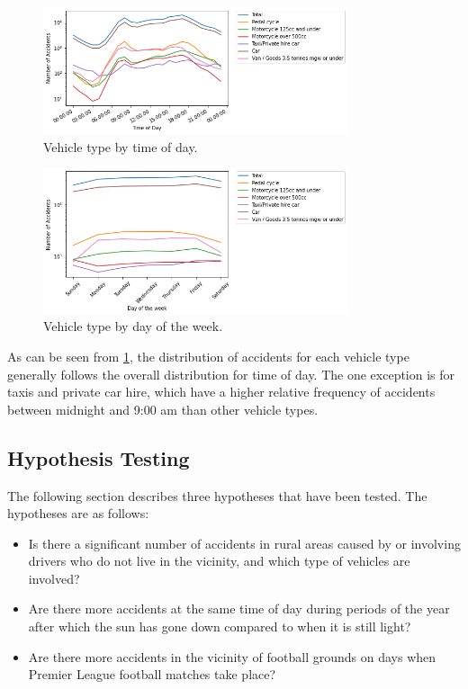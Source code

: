 \documentclass[12pt]{article}
\begin{document}
\begin{figure}[ht]
\centering     %
\includegraphics[width=0.80\textwidth]{vehicle_hour_plot}
\caption{Vehicle type by time of day.}
\label{fig:a-vehicle-hour}
\end{figure}

\begin{figure}[ht]
\centering     %
\includegraphics[width=0.80\textwidth]{vehicle_day_plot}
\caption{Vehicle type by day of the week.}
\label{fig:b-vehicle-day}
\end{figure}


\newpage

As can be seen from \ref{fig:a-vehicle-hour}, the distribution of accidents for each vehicle type generally follows the overall distribution for time of day. The one exception is for taxis and private car hire, which have a higher relative frequency of accidents between midnight and 9:00 am than other vehicle types.

\subsection{Hypothesis Testing}

The following section describes three hypotheses that have been tested. The hypotheses are as follows:

\begin{itemize}
\item Is there a significant number of accidents in rural areas caused by or involving drivers who do not live in the vicinity, and which type of vehicles are involved?
\item Are there more accidents at the same time of day during periods of the year after which the sun has gone down compared to when it is still light?
\item Are there more accidents in the vicinity of football grounds on days when Premier League football matches take place?
\end{itemize}
\end{document}
